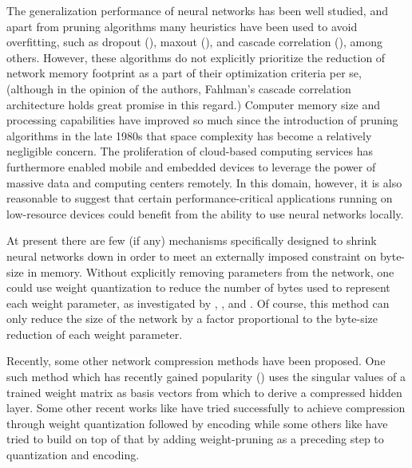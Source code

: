 
The generalization performance of neural networks has been well studied, and apart from pruning algorithms many heuristics have been used to avoid overfitting, such as dropout (\cite{srivastava2014dropout}), maxout (\cite{goodfellow2013maxout}), and cascade correlation (\cite{fahlman1989cascade}), among others. However, these algorithms do not explicitly prioritize the reduction of network memory footprint as a part of their optimization criteria per se, (although in the opinion of the authors, Fahlman's cascade correlation architecture holds great promise in this regard.) Computer memory size and processing capabilities have improved so much since the introduction of pruning algorithms in the late 1980s that space complexity has become a relatively negligible concern. The proliferation of cloud-based computing services has furthermore enabled mobile and embedded devices to leverage the power of massive data and computing centers remotely. In this domain, however, it is also reasonable to suggest that certain performance-critical applications running on low-resource devices could benefit from the ability to use neural networks locally. 

At present there are few (if any) mechanisms specifically designed to shrink neural networks down in order to meet an externally imposed constraint on byte-size in memory. Without explicitly removing parameters from the network, one could use weight quantization to reduce the number of bytes used to represent each weight parameter, as investigated by \cite{balzer1991weight}, \cite{dundar1994effects}, and \cite{hoehfeld1992learning}. Of course, this method can only reduce the size of the network by a factor proportional to the byte-size reduction of each weight parameter. 

Recently, some other network compression methods have been proposed. One such method which has recently gained popularity (\cite{prabhavalkar2016svd}) uses the singular values of a trained weight matrix as basis vectors from which to derive a compressed hidden layer. Some other recent works like \cite{Anders2016quant} have tried successfully to achieve compression through weight quantization followed by encoding while some others like \cite{deepcompression2016} have tried to build on top of that by adding weight-pruning as a preceding step to quantization and encoding. 

